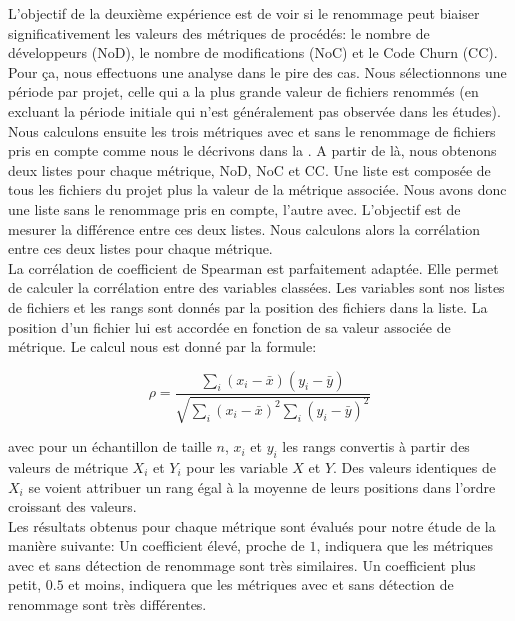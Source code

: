 L'objectif de la deuxième expérience est de voir si le renommage peut biaiser significativement les valeurs des métriques de procédés: le nombre de développeurs (NoD), le nombre de modifications (NoC) et le Code Churn (CC). Pour ça, nous effectuons une analyse dans le pire des cas. Nous sélectionnons une période par projet, celle qui a la plus grande valeur de fichiers renommés (en excluant la période initiale qui n'est généralement pas observée dans les études).\\ 

Nous calculons ensuite les trois métriques avec et sans le renommage de fichiers pris en compte comme nous le décrivons dans la . A partir de là, nous obtenons deux listes pour chaque métrique, NoD, NoC et CC. Une liste est composée de tous les fichiers du projet plus la valeur de la métrique associée. Nous avons donc une liste sans le renommage pris en compte, l'autre avec. L'objectif est de mesurer la différence entre ces deux listes. Nous calculons alors la corrélation entre ces deux listes pour chaque métrique.\\ 


La corrélation de coefficient de Spearman est parfaitement adaptée. Elle permet de calculer la corrélation entre des variables classées. Les variables sont nos listes de fichiers et les rangs sont donnés par la position des fichiers dans la liste. La position d'un fichier lui est accordée en fonction de sa valeur associée de métrique. Le calcul nous est donné par la formule: 

\[ \rho = \frac{\sum_{i}(x_{i} - \bar{x})(y_{i} - \bar{y})}{ \sqrt{ \sum_{i}(x_{i} - \bar{x})^2\sum_{i}(y_{i} - \bar{y})^2 } } \]

avec pour un échantillon de taille $n$, $x_{i}$ et $y_{i}$ les rangs convertis à partir des valeurs de métrique $X_{i}$ et $Y_{i}$ pour les variable $X$ et $Y$.
Des valeurs identiques de $X_i$ se voient attribuer un rang égal à la moyenne de leurs positions dans l'ordre croissant des valeurs.\\

Les résultats obtenus pour chaque métrique sont évalués pour notre étude de la manière suivante: Un coefficient élevé, proche de $1$, indiquera que les métriques avec et sans détection de renommage sont très similaires. Un coefficient plus petit, $0.5$ et moins, indiquera que les métriques avec et sans détection de renommage sont très différentes.\\  

